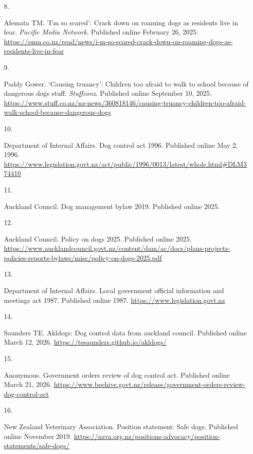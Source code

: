 \documentclass[
  letterpaper,
  DIV=11,
  numbers=noendperiod]{scrartcl}
\newlength{\cslhangindent}
\newlength{\csllabelwidth}
\newenvironment{CSLReferences}[2] %
 {\begin{list}{}{%
  \setlength{\itemindent}{0pt}
  \setlength{\leftmargin}{0pt}
  \setlength{\parsep}{0pt}
  \ifodd #1
   \setlength{\leftmargin}{\cslhangindent}
   \setlength{\itemindent}{-1\cslhangindent}
  \fi
  \setlength{\itemsep}{#2\baselineskip}}}
 {\end{list}}
\newcommand{\CSLLeftMargin}[1]{\parbox[t]{\csllabelwidth}{\strut#1\strut}}
\newcommand{\CSLRightInline}[1]{\parbox[t]{\linewidth - \csllabelwidth}{\strut#1\strut}}
\begin{document}
\begin{CSLReferences}{0}{1}
\CSLLeftMargin{8. }%
\CSLRightInline{Afemata TM. 'I{'}m so scared': Crack down on roaming
dogs as residents live in fear. \emph{Pacific Media Network}. Published
online February 26, 2025.
\url{https://pmn.co.nz/read/news/i-m-so-scared-crack-down-on-roaming-dogs-as-residents-live-in-fear}}

\CSLLeftMargin{9. }%
\CSLRightInline{Paddy Gower. {`}Causing truancy{'}: Children too afraid
to walk to school because of dangerous dogs \textbar{} stuff.
\emph{Stuffconz}. Published online September 10, 2025.
\url{https://www.stuff.co.nz/nz-news/360818146/causing-truancy-children-too-afraid-walk-school-because-dangerous-dogs}}

\CSLLeftMargin{10. }%
\CSLRightInline{Department of Internal Affairs. Dog control act 1996.
Published online May 2, 1996.
\url{https://www.legislation.govt.nz/act/public/1996/0013/latest/whole.html\#DLM374410}}

\CSLLeftMargin{11. }%
\CSLRightInline{Auckland Council. Dog management bylaw 2019. Published
online 2025.}

\CSLLeftMargin{12. }%
\CSLRightInline{Auckland Council. Policy on dogs 2025. Published online
2025.
\url{https://www.aucklandcouncil.govt.nz/content/dam/ac/docs/plans-projects-policies-reports-bylaws/misc/policy-on-dogs-2025.pdf}}

\CSLLeftMargin{13. }%
\CSLRightInline{Department of Internal Affairs. Local government
official information and meetings act 1987. Published online 1987.
\url{https://www.legislation.govt.nz}}

\CSLLeftMargin{14. }%
\CSLRightInline{Saunders TE. Akldogs: Dog control data from auckland
council. Published online March 12, 2026.
\url{https://tesaunders.github.io/akldogs/}}

\CSLLeftMargin{15. }%
\CSLRightInline{Anonymous. Government orders review of dog control act.
Published online March 21, 2026.
\url{https://www.beehive.govt.nz/release/government-orders-review-dog-control-act}}

\CSLLeftMargin{16. }%
\CSLRightInline{New Zealand Veterinary Association. Position statement:
Safe dogs. Published online November 2019.
\url{https://nzva.org.nz/positions-advocacy/position-statements/safe-dogs/}}


\end{CSLReferences}
\end{document}
